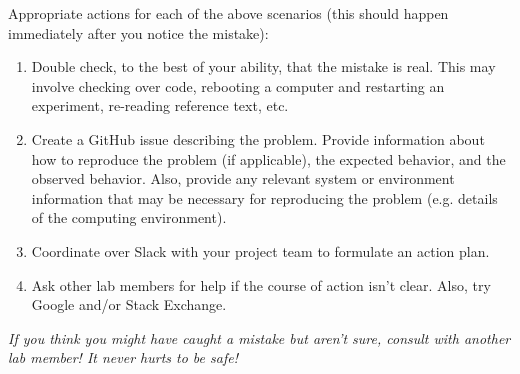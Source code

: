 \documentclass{tufte-book} %
\begin{document}
Appropriate actions for each of the above scenarios (this should
happen immediately after you notice the mistake):
\begin{enumerate}
\item Double check, to the best of your ability, that the mistake is
  real.  This may involve checking over code, rebooting a computer and
  restarting an experiment, re-reading reference text, etc.
\item Create a GitHub issue describing the problem.  Provide
  information about how to reproduce the problem (if applicable), the
  expected behavior, and the observed behavior.  Also, provide any
  relevant system or environment information that may be necessary for
  reproducing the problem (e.g. details of the computing environment).
\item Coordinate over Slack with your project team to formulate an
  action plan.
\item Ask other lab members for help if the course of action isn't
  clear.  Also, try Google and/or Stack Exchange.
\end{enumerate}

\noindent \textit{If you think you might have caught a mistake but aren't
  sure, consult with another lab member! It never hurts to be safe!}

\end{document}
